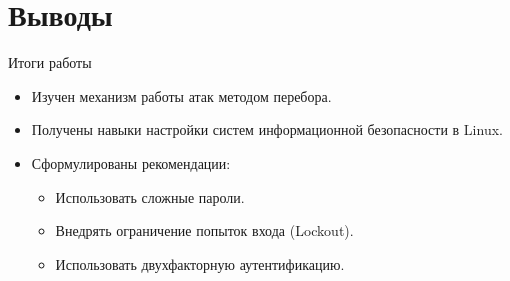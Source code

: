 \documentclass[
  ignorenonframetext,
  aspectratio=169,
  russian,
]{beamer}
\providecommand{\tightlist}{%
  \setlength{\itemsep}{0pt}\setlength{\parskip}{0pt}}
\begin{document}
\section{Выводы}\label{ux432ux44bux432ux43eux434ux44b}

\begin{frame}{Итоги работы}
\label{ux438ux442ux43eux433ux438-ux440ux430ux431ux43eux442ux44b}
\begin{itemize}[<+->]
\tightlist
\item
  Изучен механизм работы атак методом перебора.
\item
  Получены навыки настройки систем информационной безопасности в Linux.
\item
  Сформулированы рекомендации:

  \begin{itemize}[<+->]
  \tightlist
  \item
    Использовать сложные пароли.
  \item
    Внедрять ограничение попыток входа (Lockout).
  \item
    Использовать двухфакторную аутентификацию.
  \end{itemize}
\end{itemize}
\end{frame}
\end{document}
